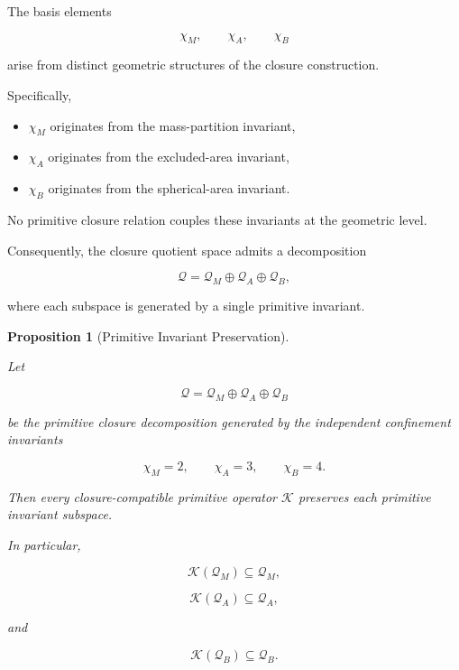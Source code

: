 \documentclass[11pt]{article}
\newtheorem{proposition}[theorem]{Proposition}
\theoremstyle{definition}
\theoremstyle{remark}
\begin{document}
The basis elements

\begin{equation}
\chi_M,
\qquad
\chi_A,
\qquad
\chi_B
\end{equation}

arise from distinct geometric structures of the closure
construction.

Specifically,

\begin{itemize}
\item \(\chi_M\) originates from the mass-partition invariant,
\item \(\chi_A\) originates from the excluded-area invariant,
\item \(\chi_B\) originates from the spherical-area invariant.
\end{itemize}

No primitive closure relation couples these invariants at the
geometric level.

Consequently, the closure quotient space admits a decomposition

\begin{equation}
\mathcal Q
= \mathcal Q_M
\oplus
\mathcal Q_A
\oplus
\mathcal Q_B,
\label{eq:Qdecomposition}
\end{equation}

where each subspace is generated by a single primitive
invariant.


\begin{proposition}[Primitive Invariant Preservation]
\label{prop:primitive_invariant_preservation}

Let

\begin{equation}
\mathcal Q
=
\mathcal Q_M
\oplus
\mathcal Q_A
\oplus
\mathcal Q_B
\end{equation}

be the primitive closure decomposition generated by the
independent confinement invariants

\begin{equation}
\chi_M=2,
\qquad
\chi_A=3,
\qquad
\chi_B=4.
\end{equation}

Then every closure-compatible primitive operator
\(\mathcal K\) preserves each primitive invariant subspace.

In particular,

\begin{equation}
\mathcal K(\mathcal Q_M)
\subseteq
\mathcal Q_M,
\end{equation}

\begin{equation}
\mathcal K(\mathcal Q_A)
\subseteq
\mathcal Q_A,
\end{equation}

and

\begin{equation}
\mathcal K(\mathcal Q_B)
\subseteq
\mathcal Q_B.
\end{equation}

\end{proposition}
\end{document}
